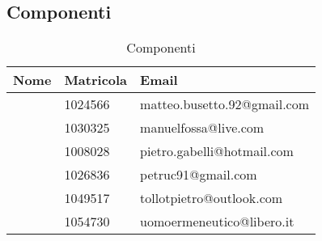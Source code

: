{	\subsection{Componenti}{
		\begin{table}[H]
			\centering
		  \begin{tabular}{p{5cm}p{3cm}p{7cm}}
			   \toprule Nome & Matricola & Email \\
			   \midrule
			   \BM & 1024566 & matteo.busetto.92@gmail.com \\
			   \FM & 1030325  &  manuelfossa@live.com\\
			   \GP & 1008028 & pietro.gabelli@hotmail.com \\
			   \PM & 1026836 & petruc91@gmail.com \\
			   \TP & 1049517 &  tollotpietro@outlook.com\\
			   \VG & 1054730 &  uomoermeneutico@libero.it\\
			   \bottomrule
		 \end{tabular}
		 	\label{tab:Componenti}
		 	\caption{Componenti}
		\end{table}
		}
}
